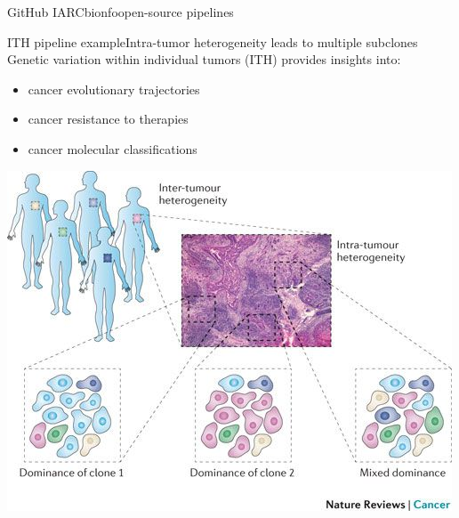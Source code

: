 \documentclass[xcolor=table,compress]{beamer} %
\begin{document}
\begin{frame}{GitHub IARCbionfo}{open-source pipelines}
\href{https://github.com/IARCbioinfo}{} \end{frame}

\begin{frame}{ITH pipeline example}{Intra-tumor heterogeneity leads to multiple subclones}
Genetic variation within individual tumors (ITH) provides insights into: \vspace*{-0.15cm}
\begin{itemize}
	\item cancer evolutionary trajectories \vspace*{-0.2cm}
	\item cancer resistance to therapies \vspace*{-0.2cm}
	\item cancer molecular classifications \pause
\end{itemize}
\begin{center}
	\includegraphics[scale=0.4]{pictures/ITH_clinics.jpg} \\
\end{center}
\end{frame}
\end{document}
